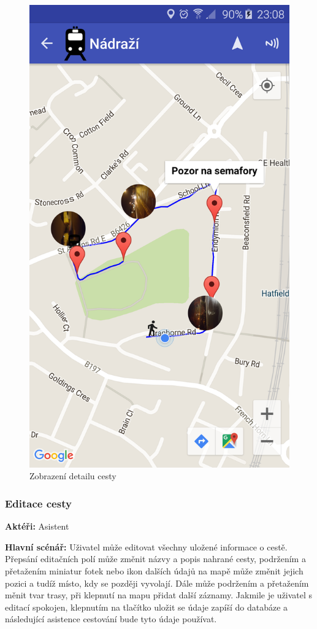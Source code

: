 \documentclass[czech,master,public,dept460,male,java,cpdeclaration]{diploma}
\newcommand{\usecase}[2]{\subsubsection{#1}\label{#2}}
\begin{document}
\begin{figure}[H]
\begin{minipage}{.5\textwidth}
                    \includegraphics[scale=0.14]{img/screen/detailcesty.png}
            \caption{Zobrazení detailu cesty}
            \label{fig:detailasistent}

       \end{minipage}
\end{figure}

\usecase{Editace cesty}{editacecesty}
\textbf{Aktéři:} Asistent

\vspace{0.1cm}
\noindent
\textbf{Hlavní scénář:} Uživatel může editovat všechny uložené informace o cestě. Přepsání editačních
polí může změnit názvy a popis nahrané cesty, podržením a přetažením miniatur fotek nebo ikon dalších údajů na mapě může změnit
jejich pozici a tudíž místo, kdy se později vyvolají. Dále může podržením a přetažením měnit tvar trasy,
při klepnutí na mapu přidat další záznamy. Jakmile je uživatel s editací spokojen, klepnutím na tlačítko
uložit se údaje zapíší do databáze a následující asistence cestování bude tyto údaje používat.
\end{document}
